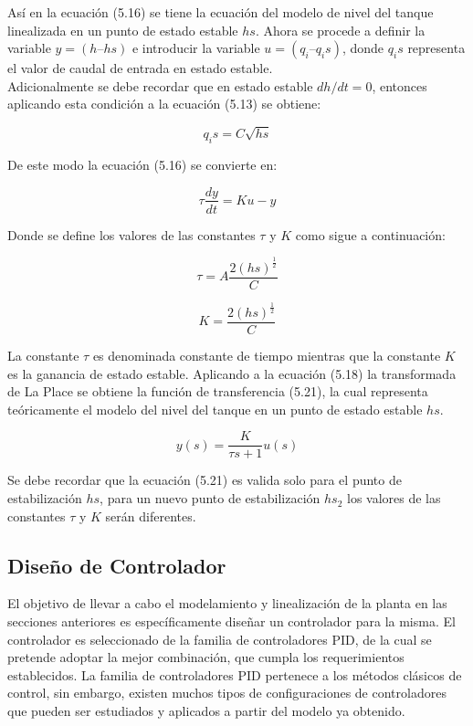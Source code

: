 \documentclass[a4paper,12pt,twoside]{proyectotanquesecci}
\begin{document}
Así en la ecuación (5.16) se tiene la ecuación del modelo de nivel del tanque linealizada en un punto de estado estable $hs$. Ahora se procede a definir la variable $y=(h–hs)$ e introducir la variable $u=(q_{i}–q_{i}s)$, donde $q_{i}s$ representa el valor de caudal de entrada en estado estable. \\

Adicionalmente se debe recordar que en estado estable $dh/dt=0$, entonces aplicando esta condición a la ecuación (5.13) se obtiene:

\begin{equation}
q_{i}s=C\sqrt{hs}
\end{equation}

De este modo la ecuación (5.16) se convierte en:

\begin{equation}
\tau\frac{dy}{dt}=Ku-y
\end{equation}

Donde se define los valores de las constantes $\tau$ y $K$ como sigue a continuación:

\begin{equation}
\tau=A\frac{2(hs)^{\frac{1}{2}}}{C}
\end{equation}

\begin{equation}
K=\frac{2(hs)^{\frac{1}{2}}}{C}
\end{equation}

La constante $\tau$ es denominada constante de tiempo mientras que la constante $K$ es la ganancia de estado estable. Aplicando a la ecuación (5.18) la transformada de La Place se obtiene la función de transferencia (5.21), la cual representa teóricamente el modelo del nivel del tanque en un punto de estado estable $hs$.

\begin{equation}
y(s)=\frac{K}{\tau s+1}u(s)
\end{equation}

Se debe recordar que la ecuación (5.21) es valida solo para el punto de estabilización $hs$, para un nuevo punto de estabilización $hs_{2}$ los valores de las constantes $\tau$ y $K$ serán diferentes.




\subsection{Diseño de Controlador}

El objetivo de llevar a cabo el modelamiento y linealización de la planta en las secciones anteriores es específicamente diseñar un controlador para la misma. El controlador es seleccionado de la familia de controladores PID, de la cual se pretende adoptar la mejor combinación, que cumpla los requerimientos establecidos. La familia de controladores PID pertenece a los métodos clásicos de control, sin embargo, existen muchos tipos de configuraciones de controladores que pueden ser estudiados y aplicados a partir del modelo ya obtenido. \\
\end{document}
